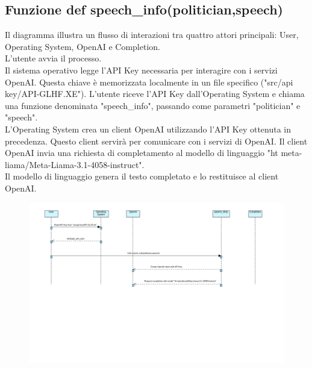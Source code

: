 \documentclass{article}
\begin{document}
	\subsection{Funzione def speech\_info(politician,speech)}
Il diagramma illustra un flusso di interazioni tra quattro attori principali: User, Operating System, OpenAI e Completion.\\
L'utente avvia il processo.\\
Il sistema operativo legge l'API Key necessaria per interagire con i servizi OpenAI. Questa chiave è memorizzata localmente in un file specifico ("src/api key/API-GLHF.XE").
L'utente riceve l'API Key dall'Operating System e chiama una funzione denominata "speech\_info", passando come parametri "politician" e "speech".\\
L'Operating System crea un client OpenAI utilizzando l'API Key ottenuta in precedenza. Questo client servirà per comunicare con i servizi di OpenAI.
Il client OpenAI invia una richiesta di completamento al modello di linguaggio "ht meta-liama/Meta-Liama-3.1-4058-instruct".\\
Il modello di linguaggio genera il testo completato e lo restituisce al client OpenAI.	
	\begin{figure}[h]
		\centering
		\includegraphics[width=1.1\textwidth]{immagini/speechscraping}
	\end{figure}
	
\end{document}
